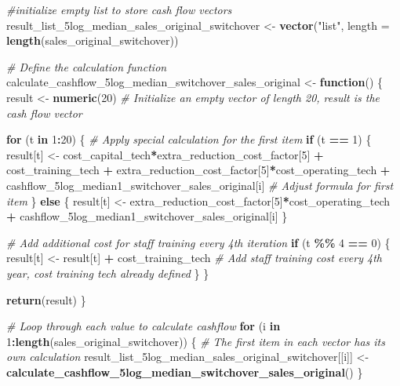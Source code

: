 \documentclass[
]{article}
\newenvironment{Shaded}{\begin{snugshade}}{\end{snugshade}}
\newcommand{\AttributeTok}[1]{\textcolor[rgb]{0.13,0.29,0.53}{#1}}
\newcommand{\CommentTok}[1]{\textcolor[rgb]{0.56,0.35,0.01}{\textit{#1}}}
\newcommand{\ControlFlowTok}[1]{\textcolor[rgb]{0.13,0.29,0.53}{\textbf{#1}}}
\newcommand{\DecValTok}[1]{\textcolor[rgb]{0.00,0.00,0.81}{#1}}
\newcommand{\FunctionTok}[1]{\textcolor[rgb]{0.13,0.29,0.53}{\textbf{#1}}}
\newcommand{\NormalTok}[1]{#1}
\newcommand{\OtherTok}[1]{\textcolor[rgb]{0.56,0.35,0.01}{#1}}
\newcommand{\SpecialCharTok}[1]{\textcolor[rgb]{0.81,0.36,0.00}{\textbf{#1}}}
\newcommand{\StringTok}[1]{\textcolor[rgb]{0.31,0.60,0.02}{#1}}
\begin{document}
\begin{Shaded}
\begin{Highlighting}[]
\CommentTok{\#initialize empty list to store cash flow vectors}
\NormalTok{result\_list\_5log\_median\_sales\_original\_switchover }\OtherTok{\textless{}{-}} \FunctionTok{vector}\NormalTok{(}\StringTok{"list"}\NormalTok{, }\AttributeTok{length =} \FunctionTok{length}\NormalTok{(sales\_original\_switchover))}


\CommentTok{\# Define the calculation function}
\NormalTok{calculate\_cashflow\_5log\_median\_switchover\_sales\_original }\OtherTok{\textless{}{-}} \ControlFlowTok{function}\NormalTok{() \{}
\NormalTok{  result }\OtherTok{\textless{}{-}} \FunctionTok{numeric}\NormalTok{(}\DecValTok{20}\NormalTok{)  }\CommentTok{\# Initialize an empty vector of length 20, result is the cash flow vector}
  
  \ControlFlowTok{for}\NormalTok{ (t }\ControlFlowTok{in} \DecValTok{1}\SpecialCharTok{:}\DecValTok{20}\NormalTok{) \{}
    \CommentTok{\# Apply special calculation for the first item}
    \ControlFlowTok{if}\NormalTok{ (t }\SpecialCharTok{==} \DecValTok{1}\NormalTok{) \{}
\NormalTok{      result[t] }\OtherTok{\textless{}{-}}\NormalTok{ cost\_capital\_tech}\SpecialCharTok{*}\NormalTok{extra\_reduction\_cost\_factor[}\DecValTok{5}\NormalTok{] }\SpecialCharTok{+}\NormalTok{ cost\_training\_tech }\SpecialCharTok{+}\NormalTok{ extra\_reduction\_cost\_factor[}\DecValTok{5}\NormalTok{]}\SpecialCharTok{*}\NormalTok{cost\_operating\_tech }\SpecialCharTok{+}\NormalTok{ cashflow\_5log\_median1\_switchover\_sales\_original[i] }\CommentTok{\# Adjust formula for first item}
\NormalTok{    \} }\ControlFlowTok{else}\NormalTok{ \{}
\NormalTok{      result[t] }\OtherTok{\textless{}{-}}\NormalTok{ extra\_reduction\_cost\_factor[}\DecValTok{5}\NormalTok{]}\SpecialCharTok{*}\NormalTok{cost\_operating\_tech }\SpecialCharTok{+}\NormalTok{ cashflow\_5log\_median1\_switchover\_sales\_original[i]}
\NormalTok{    \}}
    
    \CommentTok{\# Add additional cost for staff training every 4th iteration}
    \ControlFlowTok{if}\NormalTok{ (t }\SpecialCharTok{\%\%} \DecValTok{4} \SpecialCharTok{==} \DecValTok{0}\NormalTok{) \{}
\NormalTok{      result[t] }\OtherTok{\textless{}{-}}\NormalTok{ result[t] }\SpecialCharTok{+}\NormalTok{ cost\_training\_tech  }\CommentTok{\# Add staff training cost every 4th year, cost training tech already defined}
\NormalTok{    \}}
\NormalTok{  \}}
  
  \FunctionTok{return}\NormalTok{(result)}
\NormalTok{\}}

\CommentTok{\# Loop through each value  to calculate cashflow}
\ControlFlowTok{for}\NormalTok{ (i }\ControlFlowTok{in} \DecValTok{1}\SpecialCharTok{:}\FunctionTok{length}\NormalTok{(sales\_original\_switchover)) \{}
  \CommentTok{\# The first item in each vector has its own calculation}
\NormalTok{  result\_list\_5log\_median\_sales\_original\_switchover[[i]] }\OtherTok{\textless{}{-}} \FunctionTok{calculate\_cashflow\_5log\_median\_switchover\_sales\_original}\NormalTok{()}
\NormalTok{\}}




\end{Highlighting}
\end{Shaded}
\end{document}

